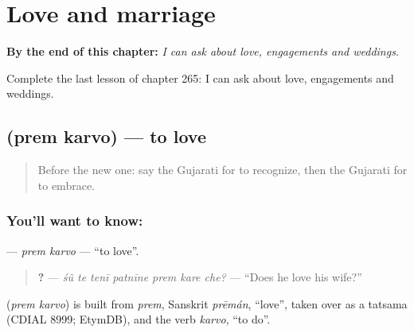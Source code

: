 
\chapter{Love and marriage}
\label{ch:gu-love-and-marriage}

\begin{chapteropening}
\textbf{By the end of this chapter:} \emph{I can ask about love, engagements and weddings.}

Complete the last lesson of chapter 265: I can ask about love, engagements and weddings.
\end{chapteropening}

\section[\texorpdfstring{\gu{પ્રેમ} \gu{કરવો} (prem karvo)}{પ્રેમ કરવો (prem karvo)}]{  (prem karvo) — to love}

\label{lesson:GU-C265-prem-karvo}



\begin{quote}
Before the new one: say the Gujarati for to recognize, then the Gujarati for to embrace.
\end{quote}

\subsection*{You'll want to know:  }
\textbf{ } — \emph{prem karvo} — \textquotedblleft{}to love\textquotedblright{}.

\begin{quote}
\textbf{      ?} — \emph{śũ te tenī patnīne prem kare che?} — \textquotedblleft{}Does he love his wife?\textquotedblright{}
\end{quote}

\begin{cousinweb}
\textbf{ } (\emph{prem karvo}) is built from \emph{prem}, Sanskrit \emph{prēmán}, \textquotedblleft{}love\textquotedblright{}, taken over as a tatsama (CDIAL 8999; EtymDB), and the verb \emph{karvo}, \textquotedblleft{}to do\textquotedblright{}.
\end{cousinweb}

